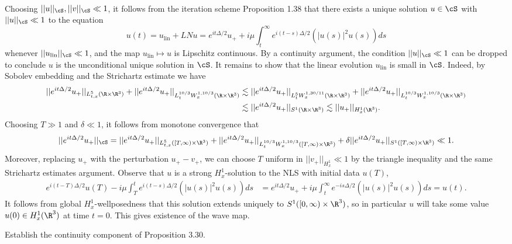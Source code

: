 \begin{solution}
\begin{align*}
		\end{align*}	
	Choosing $||u||_\cS, ||v||_\cS \ll 1$, it follows from the iteration scheme Proposition 1.38 that there exists a unique solution $u \in \cS$ with $||u||_\cS \ll 1$ to the equation 	
		\[ u(t) = u_{\text{lin}} + LN u = e^{i t \Delta/2} u_+ + i \mu \int_t^\infty e^{i (t - s) \Delta/2} (|u(s)|^2 u(s)) ds  \]
	whenever $||u_{\text{lin}} ||_\cS \ll 1$, and the map $u_{\text{lin}} \mapsto u$ is Lipschitz continuous. By a continuity argument, the condition $||u||_\cS \ll 1$ can be dropped to conclude $u$ is the unconditional unique solution in $\cS$. It remains to show that the linear evolution $u_{\text{lin}}$ is small in $\cS$. 	Indeed, by Sobolev embedding and the Strichartz estimate we have
		\begin{align*}
			 ||e^{it \Delta/2} u_+ ||_{L^5_{t, x} (\R \times \R^3)} + ||e^{it \Delta/2} u_+ ||_{L^{10/3}_t W^{1, 10/3}_{x} (\R \times \R^3)}  
			 	&\lesssim  ||e^{it \Delta/2} u_+ ||_{L^5_{t} W^{1, 30/11}_x (\R \times \R^3)} +  ||e^{it \Delta/2} u_+ ||_{L^{10/3}_{t} W^{1, 10/3}_x (\R \times \R^3)} \\
			 	& \lesssim ||e^{i t \Delta/2} u_+ ||_{S^1 (\R \times \R^3)} \lesssim ||u_+||_{H^1_x (\R^3)}.
		\end{align*}	 
	Choosing $T \gg 1$ and $\delta \ll 1$, it follows from monotone convergence that 
		\[ ||e^{it \Delta/2}u_+ ||_{\cS} =  ||e^{it \Delta/2} u_+ ||_{L^5_{t, x} ([T, \infty) \times \R^3)} + ||e^{it \Delta/2} u_+ ||_{L^{10/3}_t W^{1, 10/3}_{x} ([T, \infty) \times \R^3)} + \delta || e^{i t \Delta/2} u_+||_{S^1 ([T, \infty) \times \R^3)}  \ll 1. \]	
	Moreover, replacing $u_+$ with the perturbation $u_+ - v_+$, we can choose $T$ uniform in $||v_+||_{H^1_x} \ll 1$ by the triangle inequality and the same Strichartz estimates argument. Observe that $u$ is a strong $H^1_x$-solution to the NLS with initial data $u(T)$, 
		\begin{align*}
			 e^{i (t - T)\Delta/2} u(T) - i \mu \int_T^t e^{i (t - s)\Delta/2} (|u(s)|^2 u(s)) ds
			 	&= e^{i t\Delta/2} u_+ + i \mu \int_t^\infty e^{-i s \Delta/2} (|u(s)|^2 u(s)) ds = u(t).
		\end{align*} 
	It follows from global $H^1_x$-wellposedness that this solution extends uniquely to $S^1 ([0, \infty) \times \R^3)$, so in particular $u$ will take some value $u(0) \in H^1_x (\R^3)$ at time $t = 0$. This gives existence of the wave map. 
\end{solution}

\begin{statement}
	Establish the continuity component of Proposition 3.30.
\end{statement}

